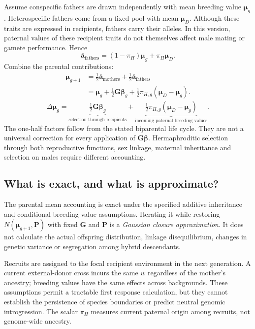 \documentclass[11pt,a4paper]{article}
\begin{document}
Assume conspecific fathers are drawn independently with mean breeding value $\boldsymbol\mu_g$. Heterospecific fathers come from a fixed pool with mean $\boldsymbol\mu_D$. Although these traits are expressed in recipients, fathers carry their alleles. In this version, paternal values of these recipient traits do not themselves affect male mating or gamete performance. Hence
\begin{equation}
\overline{\mathbf a}_{\mathrm{fathers}}
=(1-\pi_H)\boldsymbol\mu_g+\pi_H\boldsymbol\mu_D.
\end{equation}
Combine the parental contributions:
\begin{align}
\boldsymbol\mu_{g+1}
&=\tfrac12\overline{\mathbf a}_{\mathrm{mothers}}
+\tfrac12\overline{\mathbf a}_{\mathrm{fathers}}\\
&=\boldsymbol\mu_g+\tfrac12\mathbf G\boldsymbol\beta_g
+\tfrac12\pi_{H,g}(\boldsymbol\mu_D-\boldsymbol\mu_g).
\label{eq:recursion}
\end{align}
\begin{equation}
\boxed{\Delta\boldsymbol\mu_g
=\underbrace{\tfrac12\mathbf G\boldsymbol\beta_g}_{\text{selection through recipients}}
+\underbrace{\tfrac12\pi_{H,g}(\boldsymbol\mu_D-\boldsymbol\mu_g)}_{\text{incoming paternal breeding values}}.}
\end{equation}
The one-half factors follow from the stated biparental life cycle. They are not a universal correction for every application of $\mathbf G\boldsymbol\beta$. Hermaphroditic selection through both reproductive functions, sex linkage, maternal inheritance and selection on males require different accounting.

\subsection{What is exact, and what is approximate?}
The parental mean accounting is exact under the specified additive inheritance and conditional breeding-value assumptions. Iterating it while restoring $N(\boldsymbol\mu_{g+1},\mathbf P)$ with fixed $\mathbf G$ and $\mathbf P$ is a \emph{Gaussian closure approximation}. It does not calculate the actual offspring distribution, linkage disequilibrium, changes in genetic variance or segregation among hybrid descendants.

Recruits are assigned to the focal recipient environment in the next generation. A current external-donor cross incurs the same $w$ regardless of the mother's ancestry; breeding values have the same effects across backgrounds. These assumptions permit a tractable first response calculation, but they cannot establish the persistence of species boundaries or predict neutral genomic introgression. The scalar $\pi_H$ measures current paternal origin among recruits, not genome-wide ancestry.
\end{document}

